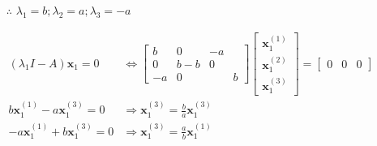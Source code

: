 \documentclass[12pt, a4paper]{scrartcl}
\begin{document}
\begin{enumerate}
            \begin{itemize}
                \item[$\therefore$] $\lambda_1 = b; \lambda_2 = a; \lambda_3 = -a$
            \end{itemize}
            \begin{align*}
                (\lambda_1I-A)\textbf{x}_1 = 0 &\Leftrightarrow \begin{bmatrix}
                    b & 0 & -a \\ 0 & b-b&0\\-a&0&&b
                \end{bmatrix}\begin{bmatrix}
                    \textbf{x}_1^{(1)}\\\textbf{x}_1^{(2)}\\\textbf{x}_1^{(3)}
                \end{bmatrix} = \begin{bmatrix}
                    0&0&0
                \end{bmatrix}
                \\ b\textbf{x}_1^{(1)} - a\textbf{x}_1^{(3)} = 0 &\Rightarrow \textbf{x}_1^{(3)} = \frac{b}{a}\textbf{x}_1^{(3)}
                \\ -a\textbf{x}_1^{(1)}+b\textbf{x}_1^{(3)} = 0 &\Rightarrow \textbf{x}_1^{(3)} = \frac{a}{b}\textbf{x}_1^{(1)}
            \end{align*}


\end{enumerate}
\end{document}

